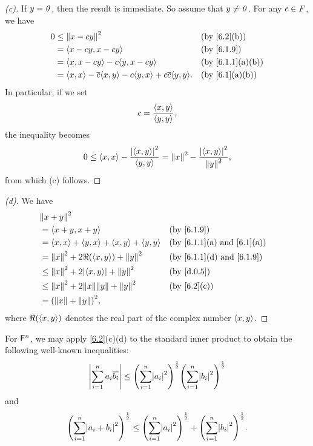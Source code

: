 \begin{proof}[(c)]
  If \(y = \mathit{0}\), then the result is immediate.
  So assume that \(y \neq \mathit{0}\).
  For any \(c \in \mathit{F}\), we have
  \begin{align*}
    0 & \leq \norm{x - cy}^2                                                       &  & \text{(by \cref{6.2}(b))}      \\
      & = \inn{x - cy, x - cy}                                                     &  & \text{(by \cref{6.1.9})}       \\
      & = \inn{x, x - cy} - c \inn{y, x - cy}                                      &  & \text{(by \cref{6.1.1}(a)(b))} \\
      & = \inn{x, x} - \conj{c} \inn{x, y} - c \inn{y, x} + c \conj{c} \inn{y, y}. &  & \text{(by \cref{6.1}(a)(b))}
  \end{align*}
  In particular, if we set
  \[
    c = \frac{\left\langle x, y\right\rangle}{\left\langle y, y\right\rangle},
  \]
  the inequality becomes
  \[
    0 \leq \left\langle x, x\right\rangle - \frac{\left\lvert\left\langle x, y\right\rangle\right\rvert^2}{\left\langle y, y\right\rangle} = \left\lVert x\right\rVert^2 - \frac{\left\lvert\left\langle x, y\right\rangle\right\rvert^2}{\left\lVert y\right\rVert^2},
  \]
  from which (c) follows.
\end{proof}

\begin{proof}[(d)]
  We have
  \begin{align*}
     & \norm{x + y}^2                                                                                         \\
     & = \inn{x + y, x + y}                                &  & \text{(by \cref{6.1.9})}                      \\
     & = \inn{x, x} + \inn{y, x} + \inn{x, y} + \inn{y, y} &  & \text{(by \cref{6.1.1}(a) and \cref{6.1}(a))} \\
     & = \norm{x}^2 + 2 \Re(\inn{x, y}) + \norm{y}^2       &  & \text{(by \cref{6.1.1}(d) and \cref{6.1.9})}  \\
     & \leq \norm{x}^2 + 2 \abs{\inn{x, y}} + \norm{y}^2   &  & \text{(by \cref{d.0.5})}                      \\
     & \leq \norm{x}^2 + 2 \norm{x} \norm{y} + \norm{y}^2  &  & \text{(by \cref{6.2}(c))}                     \\
     & = \pa{\norm{x} + \norm{y}}^2,
  \end{align*}
  where \(\Re(\left\langle x, y\right\rangle)\) denotes the real part of the complex number \(\left\langle x, y\right\rangle\).
\end{proof}

\begin{eg}\label{6.1.11}
  For \(\mathsf{F}^n\), we may apply \cref{6.2}(c)(d) to the standard inner product to obtain the following well-known inequalities:
  \[
    \abs{\sum_{i = 1}^n a_i \conj{b_i}} \leq \pa{\sum_{i = 1}^n \abs{a_i}^2}^{\frac{1}{2}} \pa{\sum_{i = 1}^n \abs{b_i}^2}^{\frac{1}{2}}
  \]
  and
  \[
    \pa{\sum_{i = 1}^n \abs{a_i + b_i}^2}^{\frac{1}{2}} \leq \pa{\sum_{i = 1}^n \abs{a_i}^2}^{\frac{1}{2}} + \pa{\sum_{i = 1}^n \abs{b_i}^2}^{\frac{1}{2}}.
  \]
\end{eg}

